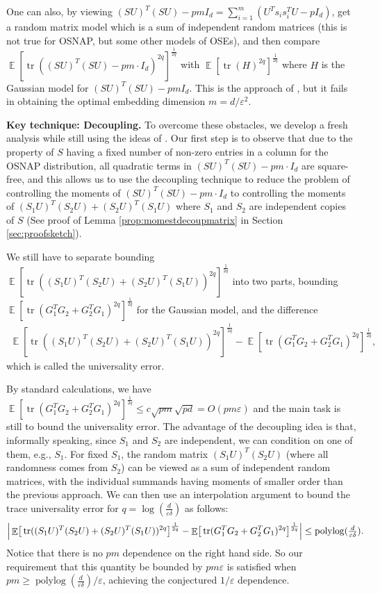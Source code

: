 \documentclass[11pt]{amsart}
\numberwithin{equation}{section}
\numberwithin{equation}{section}
\DeclareMathOperator{\E}{\mathbb{E}}
\DeclareMathOperator*{\tr}{tr}
\DeclareMathOperator{\polylog}{polylog}
\theoremstyle{remark}
\theoremstyle{definition}
\begin{document}
One can also, by viewing $(SU)^T(SU) - pmI_{d} =\sum_{i=1}^m (U^Ts_is_i^TU-pI_{d})$, get a random matrix model which is a sum of independent random matrices (this is not true for OSNAP, but some other models of OSEs), and then compare $\E[\tr ((SU)^T(SU) - pm \cdot I_{d})^{2q}]^{\frac{1}{2q}}$ with $\E[\tr (H)^{2q}]^{\frac{1}{2q}}$ where $H$ is the Gaussian model for $(SU)^T(SU) - pmI_{d}$. This is the approach of  \cite[Proposition 9.15]{brailovskaya2022universality}, but it fails in obtaining the optimal embedding dimension $m = d/\varepsilon^2$.

\textbf{Key technique: Decoupling.} To overcome these obstacles, we develop a fresh analysis while still using the ideas of \cite{brailovskaya2022universality}. Our first step is to observe that due to the property of $S$ having a fixed number of non-zero entries in a column for the OSNAP distribution, all quadratic terms in $(SU)^T(SU) - pm\cdot I_d$ are square-free, and this allows us to use the decoupling technique to reduce the problem of controlling the moments of $(SU)^T(SU) - pm\cdot I_d$ to controlling the moments of $(S_1U)^T(S_2U) + (S_2U)^T(S_1U)$ where $S_1$ and $S_2$ are independent copies of $S$ (See proof of Lemma \ref{prop:momestdecoupmatrix} in Section \ref{sec:proofsketch}).

We still have to separate bounding $\E[\tr((S_1U)^T(S_2U)+ (S_2U)^T(S_1U) )^{2q}]^\frac{1}{2q}$ into two parts, bounding $\E[\tr(G_1^TG_2+G_2^TG_1 )^{2q}]^\frac{1}{2q}$ for the Gaussian model, and the difference 
\begin{align*}\E[\tr((S_1U)^T(S_2U)+ (S_2U)^T(S_1U))^{2q}]^\frac{1}{2q}-\E[\tr(G_1^TG_2+G_2^TG_1 )^{2q}]^\frac{1}{2q},\end{align*}
which is called the universality error.

By standard calculations, we have $\E[\tr(G_1^TG_2+G_2^TG_1)^{2q}]^\frac{1}{2q} \le c \sqrt{pm}\sqrt{pd} = O(pm \varepsilon)$ and the main task is still to bound the universality error. The advantage of the decoupling idea is that, informally speaking, since $S_1$ and $S_2$ are independent, we can condition on one of them, e.g., $S_1$. For fixed $S_1$, the random matrix $(S_1U)^T(S_2U)$ (where all randomness comes from $S_2$) can be viewed as a sum of independent random matrices, with the individual summands having moments of smaller order than the previous approach. We can then use an interpolation argument to bound the trace universality error for $q=\log(\frac{d}{\varepsilon \delta})$ as follows:
\begin{equation}\label{eq:decouplepolylogunivererror}
     \begin{aligned}
         \Big|\E\!\big[\tr((S_1U)^T(S_2U)+ (S_2U)^T(S_1U))^{2q}\big]^\frac{1}{2q}-\E\!\big[\tr(G_1^TG_2+G_2^TG_1 )^{2q}\big]^\frac{1}{2q}\Big|\le \polylog(\tfrac{d}{\varepsilon \delta}).\hspace{-3mm}
     \end{aligned}
 \end{equation}
 Notice that there is no $pm$ dependence on the right hand side. So our requirement that this quantity be bounded by $pm\varepsilon$ is satisfied when $pm \ge \polylog(\frac{d}{\varepsilon \delta})/\varepsilon$, achieving the conjectured $1/\varepsilon$ dependence. 
\end{document}
